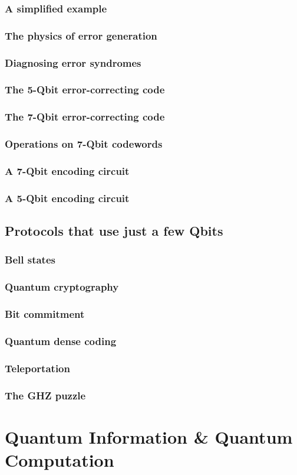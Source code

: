 \documentclass{book}
\theoremstyle{definition}
\begin{document}
\subsection{A simplified example}
\subsection{The physics of error generation}
\subsection{Diagnosing error syndromes}
\subsection{The 5-Qbit error-correcting code}
\subsection{The 7-Qbit error-correcting code}
\subsection{Operations on 7-Qbit codewords}
\subsection{A 7-Qbit encoding circuit}
\subsection{A 5-Qbit encoding circuit}

\newpage

\section{Protocols that use just a few Qbits}

\subsection{Bell states}
\subsection{Quantum cryptography}
\subsection{Bit commitment}
\subsection{Quantum dense coding}
\subsection{Teleportation}
\subsection{The GHZ puzzle}











\chapter{Quantum Information \& Quantum Computation}
\newpage
\end{document}
